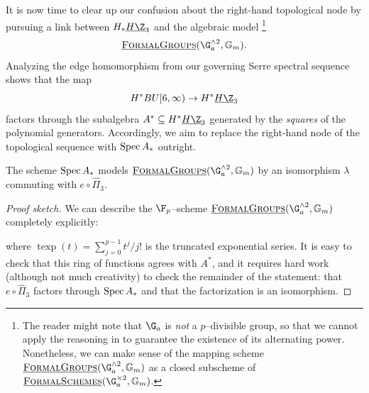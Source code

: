 It is now time to clear up our confusion about the right-hand topological node by pursuing a link between \(H_* \OS{H\Z}{3}\) and the algebraic model%
\footnote{%
The reader might note that \(\G_a\) is \emph{not} a \(p\)--divisible group, so that we cannot apply the reasoning in  to guarantee the existence of its alternating power.
Nonetheless, we can make sense of the mapping scheme \(\InternalHom{FormalGroups}(\G_a^{\sm 2}, \Gm)\) as a closed subscheme of \(\InternalHom{FormalSchemes}(\G_a^{\times 2}, \Gm)\).
}
\[\InternalHom{FormalGroups}(\G_a^{\sm 2}, \Gm).\]
Analyzing the edge homomorphism from our governing Serre spectral sequence shows that the map \[H^* BU[6, \infty) \to H^* \OS{H\Z}{3}\] factors through the subalgebra \(A^* \subseteq H^* \OS{H\Z}{3}\) generated by the \emph{squares} of the polynomial generators.
Accordingly, we aim to replace the right-hand node of the topological sequence with \(\operatorname{Spec} A_*\) outright.

\begin{lemma}
The scheme \(\operatorname{Spec} A_*\) models \(\InternalHom{FormalGroups}(\G_a^{\sm 2}, \Gm)\) by an isomorphism \(\lambda\) commuting with \(e \circ \hat \Pi_3\).
\end{lemma}
\begin{proof}[Proof sketch]
We can describe the \(\F_p\)--scheme \(\InternalHom{FormalGroups}(\G_a^{\sm 2}, \Gm)\) completely explicitly:
\begin{center}
\end{center}
where \(\operatorname{texp}(t) = \sum_{j=0}^{p-1} t^j / j!\) is the truncated exponential series.
It is easy to check that this ring of functions agrees with \(A^*\), and it requires hard work (although not much creativity) to check the remainder of the statement: that \(e \circ \hat \Pi_3\) factors through \(\operatorname{Spec} A_*\) and that the factorization is an isomorphism.
\end{proof}

